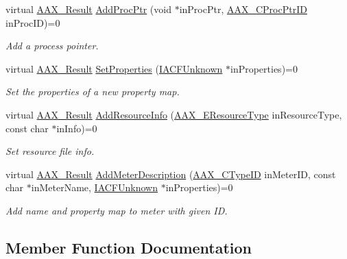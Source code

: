 \begin{DoxyCompactItemize}
virtual \mbox{\hyperlink{a00392_a4d8f69a697df7f70c3a8e9b8ee130d2f}{A\+A\+X\+\_\+\+Result}} \mbox{\hyperlink{a01653_a7f33575a0f17b9e869401658b193b978}{Add\+Proc\+Ptr}} (void $\ast$in\+Proc\+Ptr, \mbox{\hyperlink{a00401_af0682195d377392ad356fd2b00c36892}{A\+A\+X\+\_\+\+C\+Proc\+Ptr\+ID}} in\+Proc\+ID)=0
\begin{DoxyCompactList}\small\item\em Add a process pointer. \end{DoxyCompactList}\item 
virtual \mbox{\hyperlink{a00392_a4d8f69a697df7f70c3a8e9b8ee130d2f}{A\+A\+X\+\_\+\+Result}} \mbox{\hyperlink{a01653_a840a5ddf4d0e94d257709aa67cd29b23}{Set\+Properties}} (\mbox{\hyperlink{a01409}{I\+A\+C\+F\+Unknown}} $\ast$in\+Properties)=0
\begin{DoxyCompactList}\small\item\em Set the properties of a new property map. \end{DoxyCompactList}\item 
virtual \mbox{\hyperlink{a00392_a4d8f69a697df7f70c3a8e9b8ee130d2f}{A\+A\+X\+\_\+\+Result}} \mbox{\hyperlink{a01653_a567d1b726a83de8553275300d9cbb763}{Add\+Resource\+Info}} (\mbox{\hyperlink{a00491_ae2805e88175d975589153a04e42898bb}{A\+A\+X\+\_\+\+E\+Resource\+Type}} in\+Resource\+Type, const char $\ast$in\+Info)=0
\begin{DoxyCompactList}\small\item\em Set resource file info. \end{DoxyCompactList}\item 
virtual \mbox{\hyperlink{a00392_a4d8f69a697df7f70c3a8e9b8ee130d2f}{A\+A\+X\+\_\+\+Result}} \mbox{\hyperlink{a01653_afa79bd68910778239c241fd1d81fef09}{Add\+Meter\+Description}} (\mbox{\hyperlink{a00392_ac678f9c1fbcc26315d209f71a147a175}{A\+A\+X\+\_\+\+C\+Type\+ID}} in\+Meter\+ID, const char $\ast$in\+Meter\+Name, \mbox{\hyperlink{a01409}{I\+A\+C\+F\+Unknown}} $\ast$in\+Properties)=0
\begin{DoxyCompactList}\small\item\em Add name and property map to meter with given ID. \end{DoxyCompactList}\end{DoxyCompactItemize}


\subsection{Member Function Documentation}
\mbox{\label{a01653_a9e2eabbcaa46ada4b5f9bab2663f8a9f}} 
